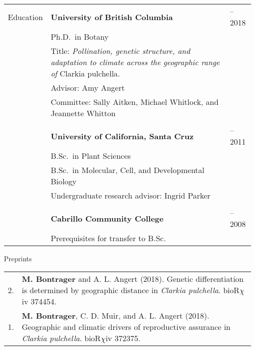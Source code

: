 \documentclass[letterpaper,11pt,oneside]{article}
\newcommand\hangbibentry[1]{%
    \smallskip\par\hangpara{1em}{1}\bibentry{#1}\smallskip\par 
}
\begin{document}
\noindent \begin{tabular}{@{} p{3cm} p{11.21cm} >{\raggedleft\arraybackslash}p{1.7cm}}
\Large{Education}    & \textbf{University of British Columbia} & 2012--2018 \\
& Ph.D.\ in Botany & \\
& \raggedright{Title: \textit{Pollination, genetic structure, and adaptation to climate across the geographic range of} Clarkia pulchella.} & \\
& \raggedright{Advisor: Amy Angert} & \\
& \raggedright{Committee: Sally Aitken, Michael Whitlock, and Jeannette Whitton} & \\
& & \\
& \textbf{University of California, Santa Cruz} & 2008--2011 \\
& B.Sc.\ in Plant Sciences & \\
& B.Sc.\ in Molecular, Cell, and Developmental Biology& \\
& Undergraduate research advisor: Ingrid Parker & \\
& & \\
& \textbf{Cabrillo Community College} &  2007--2008 \\
& Prerequisites for transfer to B.Sc. & \\
\end{tabular}
\bigskip


\noindent\Large{Preprints} 
\normalsize
\bigskip

\bgroup
\def\arraystretch{1.2}
\noindent \begin{tabular}{@{} p{1cm} >{\raggedright\arraybackslash}p{15.11cm}}
2. & \textbf{M. Bontrager} and A. L. Angert (2018). Genetic differentiation is determined by geographic distance in \textit{Clarkia pulchella}. bioR$\chi$iv 374454. \\
1. & \textbf{M. Bontrager}, C. D. Muir, and A. L. Angert (2018). Geographic and climatic drivers of reproductive assurance in \textit{Clarkia pulchella}. bioR$\chi$iv 372375.\\
\end{tabular}
\egroup
\bigskip
\end{document}

